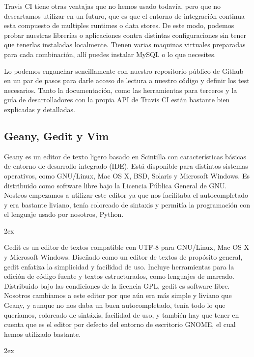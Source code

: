 \documentclass[12pt,a4paper]{report}
\begin{document}
Travis CI tiene otras ventajas que no hemos usado todavía, pero que no
descartamos utilizar en un futuro, que es que el entorno de integración 
continua esta compuesto de multiples runtimes o data stores. De este modo, 
podemos probar nuestras librerías o aplicaciones contra distintas 
configuraciones sin tener que tenerlas instaladas localmente. Tienen varias 
maquinas virtuales preparadas para cada combinación, allí puedes instalar MySQL 
o lo que necesites.

Lo podemos enganchar sencillamente con nuestro repositorio público de Github en
un par de pasos para darle acceso de lectura a nuestro código y definir los test
necesarios. Tanto la documentación, como las herramientas para terceros y la
guía de desarrolladores con la propia API de Travis CI están bastante bien
explicadas y detalladas. 

\subsection{Geany, Gedit y Vim}

Geany es un editor de texto ligero basado en Scintilla con características
básicas de entorno de desarrollo integrado (IDE). Está disponible para distintos
sistemas operativos, como GNU/Linux, Mac OS X, BSD, Solaris y Microsoft Windows.
Es distribuido como software libre bajo la Licencia Pública General de GNU.
Nostros empezamos a utilizar este editor ya que nos facilitaba el autocompletado
y era bastante liviano, tenía coloreado de sintaxis y permitía la programación
con el lenguaje usado por nosotros, Python. 

\parskip 2ex

Gedit es un editor de textos compatible con UTF-8 para GNU/Linux, Mac OS X y
Microsoft Windows. Diseñado como un editor de textos de propósito general, gedit
enfatiza la simplicidad y facilidad de uso. Incluye herramientas para la edición
de código fuente y textos estructurados, como lenguajes de marcado. Distribuido 
bajo las condiciones de la licencia GPL, gedit es software libre.
Nosotros cambiamos a este editor por que aún era más simple y liviano que Geany,
y aunque no nos daba un buen autocompletado, tenía todo lo que queríamos,
coloreado de sintáxis, facilidad de uso, y también hay que tener en cuenta que
es el editor por defecto del entorno de escritorio GNOME, el cual hemos
utilizado bastante. 

\parskip 2ex
\end{document}
